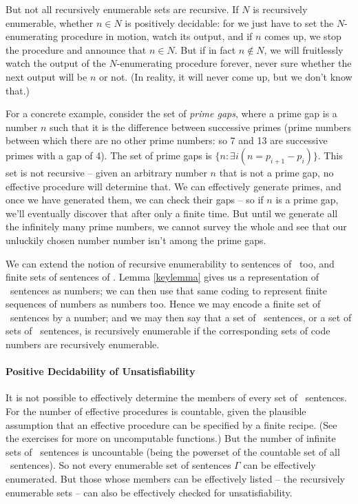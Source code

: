 But not all recursively enumerable sets are recursive. If $N$ is recursively enumerable, whether $n\in N$ is positively decidable: for we just have to set the $N$-enumerating procedure in motion, watch its output, and if $n$ comes up, we stop the procedure and announce that $n\in N$. But if in fact $n\notin N$, we will fruitlessly watch the output of the $N$-enumerating procedure forever, never sure whether the next output will be $n$ or not. (In reality, it will never come up, but we don't know that.)

For a concrete example, consider the set of \emph{prime gaps}, where a prime gap is a number $n$ such that it is the difference between successive primes (prime numbers between which there are no other prime numbers: so 7 and 13 are successive primes with a gap of 4). The set of prime gaps is $\{n: \exists i (n = p_{i+1}-p_{i})\}$. This set is not recursive – given an arbitrary number $n$ that is not a prime gap, no effective procedure will determine that. We can effectively generate primes, and once we have generated them, we can check their gaps – so if $n$ is a prime gap, we'll eventually discover that after only a finite time. But until we generate all the infinitely many prime numbers, we cannot survey the whole and see that our unluckily chosen number number isn't among the prime gaps.

We can extend the notion of recursive enumerability to sentences of \lone\ too, and finite sets of sentences of \lone. Lemma \ref{keylemma} gives us a representation of \lone\ sentences as numbers; we can then use that same coding to represent finite sequences of numbers as numbers too. Hence we may encode a finite set of \lone\ sentences by a number; and we may then say that a set of \lone\ sentences, or a set of sets of \lone\ sentences, is recursively enumerable if the corresponding sets of code numbers are recursively enumerable.



\paragraph{Positive Decidability of Unsatisfiability}  It is not possible to effectively determine the members of every set of \lone\ sentences. For the number of effective procedures is countable, given the plausible assumption that an effective procedure can be specified by a finite recipe. (See the exercises for more on uncomputable functions.) But the number of infinite sets of \lone\ sentences is uncountable (being the powerset of the countable set of all \lone\ sentences).  So not every enumerable set of sentences $\Gamma$ can be effectively enumerated. But those whose members can be effectively listed – the recursively enumerable sets – can also be effectively checked for unsatisfiability. 

